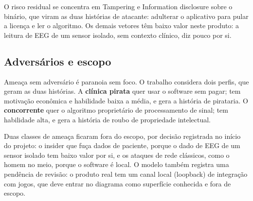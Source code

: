 O risco residual se concentra em Tampering e Information disclosure sobre o binário, que viram as duas histórias de atacante: adulterar o aplicativo para pular a licença e ler o algoritmo. Os demais vetores têm baixo valor neste produto: a leitura de EEG de um sensor isolado, sem contexto clínico, diz pouco por si.

\subsection{Adversários e escopo}

Ameaça sem adversário é paranoia sem foco. O trabalho considera dois perfis, que geram as duas histórias. A \textbf{clínica pirata} quer usar o software sem pagar; tem motivação econômica e habilidade baixa a média, e gera a história de pirataria. O \textbf{concorrente} quer o algoritmo proprietário de processamento de sinal; tem habilidade alta, e gera a história de roubo de propriedade intelectual.

Duas classes de ameaça ficaram fora do escopo, por decisão registrada no início do projeto: o insider que fuça dados de paciente, porque o dado de EEG de um sensor isolado tem baixo valor por si, e os ataques de rede clássicos, como o homem no meio, porque o software é local. O modelo também registra uma pendência de revisão: o produto real tem um canal local (loopback) de integração com jogos, que deve entrar no diagrama como superfície conhecida e fora de escopo.
